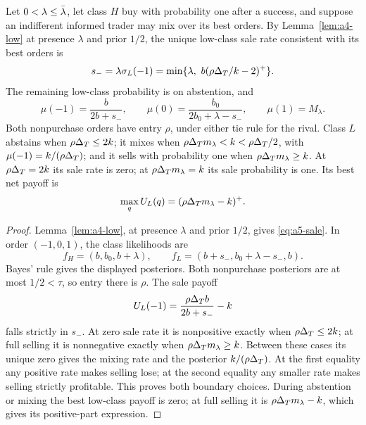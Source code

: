 \begin{lemma}\label{lem:a5-sale}
Let \(0<\lambda\le\bar\lambda\), let class \(H\) buy with probability one after a success, and suppose an indifferent informed trader
may mix over its best orders. By Lemma~\ref{lem:a4-low} at presence \(\lambda\) and prior \(1/2\),
the unique low-class sale rate consistent with its best orders is
\begin{equation}\label{eq:a5-sale}
 s_-=\lambda\sigma_L(-1)=\min\{\lambda,\ b(\rho\Delta_T/k-2)^+\}.
\end{equation}
The remaining low-class probability is on abstention, and
\[
 \mu(-1)=\frac{b}{2b+s_-},\qquad
 \mu(0)=\frac{b_0}{2b_0+\lambda-s_-},\qquad \mu(1)=M_\lambda.
\]
Both nonpurchase orders have entry \(\rho\), under either tie rule for the rival. Class \(L\) abstains when
\(\rho\Delta_T\le2k\); it mixes when \(\rho\Delta_T m_\lambda<k<\rho\Delta_T/2\), with
\(\mu(-1)=k/(\rho\Delta_T)\); and it sells with probability one when \(\rho\Delta_T m_\lambda\ge k\).
At \(\rho\Delta_T=2k\) its sale rate is zero; at \(\rho\Delta_T m_\lambda=k\) its sale probability is one.
Its best net payoff is
\[
 \max_q U_L(q)=(\rho\Delta_T m_\lambda-k)^+.
\]
\end{lemma}

\begin{proof}
Lemma~\ref{lem:a4-low}, at presence \(\lambda\) and prior \(1/2\), gives \eqref{eq:a5-sale}.
In order \((-1,0,1)\), the class likelihoods are
\[
 f_H=(b,b_0,b+\lambda),\qquad f_L=(b+s_-,b_0+\lambda-s_-,b).
\]
Bayes' rule gives the displayed posteriors. Both nonpurchase posteriors are at most \(1/2<\tau\),
so entry there is \(\rho\). The sale payoff
\[
 U_L(-1)=\frac{\rho\Delta_T b}{2b+s_-}-k
\]
falls strictly in \(s_-\). At zero sale rate it is nonpositive exactly when \(\rho\Delta_T\le2k\);
at full selling it is nonnegative exactly when \(\rho\Delta_T m_\lambda\ge k\).
Between these cases its unique zero gives the mixing rate and the posterior \(k/(\rho\Delta_T)\).
At the first equality any positive rate makes selling lose; at the second equality any smaller rate makes
selling strictly profitable. This proves both boundary choices. During abstention or mixing the best low-class
payoff is zero; at full selling it is \(\rho\Delta_T m_\lambda-k\), which gives its positive-part expression.
\end{proof}

